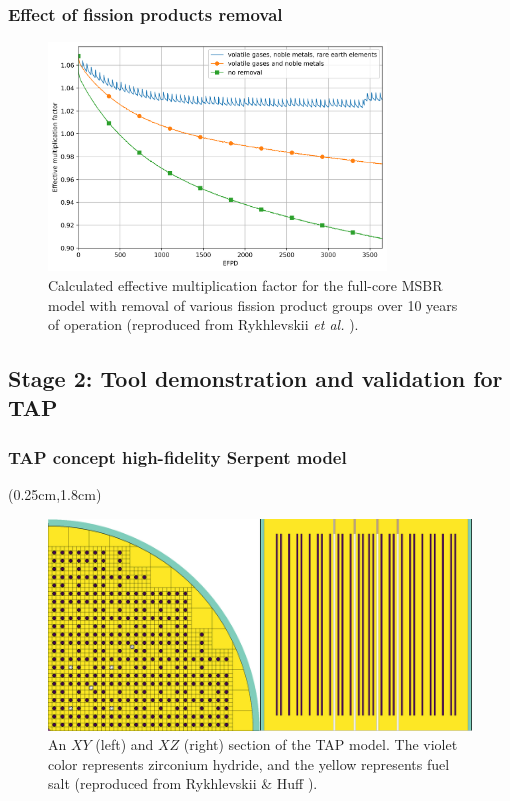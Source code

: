 \begin{frame}
\frametitle{Effect of fission products removal}       

\begin{figure}[t] %
	\centering
	\includegraphics[width=0.8\textwidth]{../figures/keff_rem_cases.png} 
	\caption{Calculated effective multiplication factor for the full-core 
		\gls{MSBR} model with removal of various fission product groups over 
		10 	years of operation (reproduced from Rykhlevskii \emph{et al.} 
		\cite{rykhlevskii_modeling_2019}).}
\end{figure}

\end{frame}


\subsection{Stage 2: Tool demonstration and validation for \gls{TAP}}

\begin{frame}
\frametitle{\gls{TAP} concept high-fidelity Serpent model}
	  \begin{textblock*}{12.25cm}(0.25cm,1.8cm) %
\begin{figure}[htp!] %
	\includegraphics[width=\textwidth]{./images/tap_model.png}
	\caption{An $XY$ (left) and $XZ$ (right) section of the \gls{TAP} model. 
	The violet color represents
zirconium hydride, and the yellow represents 
	fuel salt 
	(reproduced from Rykhlevskii \& Huff \cite{rykhlevskii_milestone_2019}).}
\end{figure}
	  \end{textblock*}
\end{frame}


